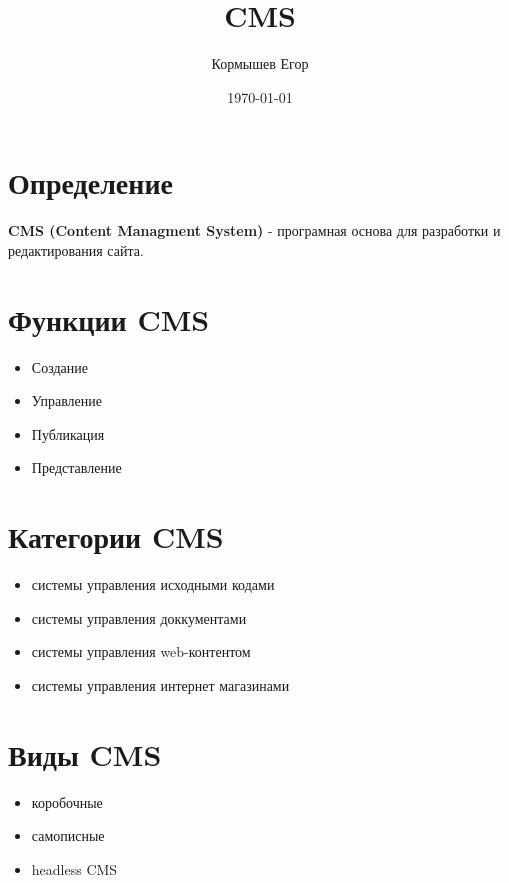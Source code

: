 \documentclass[11pt]{article}
\author{Кормышев Егор}
\date{\today}
\title{CMS}
\begin{document}
\maketitle
\tableofcontents


\section{Определение}
\label{sec:orgde84f99}

\textbf{CMS (Content Managment System)} - програмная основа для разработки и редактирования сайта. 

\section{Функции CMS}
\label{sec:orgf21b28e}

\begin{itemize}
\item Создание
\item Управление
\item Публикация
\item Представление
\end{itemize}

\section{Категории CMS}
\label{sec:org95e5d13}

\begin{itemize}
\item системы управления исходными кодами
\item системы управления доккументами
\item системы управления web-контентом
\item системы управления интернет магазинами
\end{itemize}

\section{Виды CMS}
\label{sec:orgb3c0bb6}

\begin{itemize}
\item коробочные
\item самописные
\item headless CMS
\end{itemize}
\end{document}
